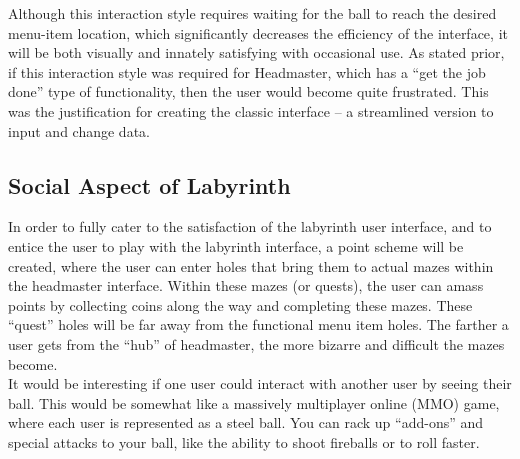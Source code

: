 \documentclass{article}
\begin{document}
 Although this interaction style requires waiting for the ball to reach the desired menu-item location, which significantly decreases the efficiency of the interface, it will be both visually and innately satisfying with occasional use.  As stated prior, if this interaction style was required for Headmaster, which has a “get the job done” type of functionality, then the user would become quite frustrated.  This was the justification for creating the classic interface – a streamlined version to input and change data.

\subsection{Social Aspect of Labyrinth}

In order to fully cater to the satisfaction of the labyrinth user interface, and to entice the user to play with the labyrinth interface, a point scheme will be created, where the user can enter holes that bring them to actual mazes within the headmaster interface.  Within these mazes (or quests), the user can amass points by collecting coins along the way and completing these mazes.  These “quest” holes will be far away from the functional menu item holes.   The farther a user gets from the “hub” of headmaster, the more bizarre and difficult the mazes become.\\

It would be interesting if one user could interact with another user by seeing their ball.  This would be somewhat like a massively multiplayer online (MMO) game, where each user is represented as a steel ball.  You can rack up “add-ons” and special attacks to your ball, like the ability to shoot fireballs or to roll faster.
\end{document}
